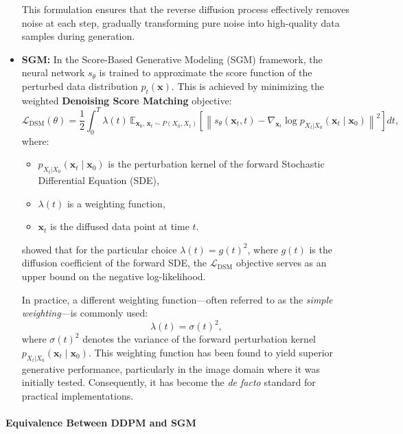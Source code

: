 \begin{itemize}
    This formulation ensures that the reverse diffusion process effectively removes noise at each step, gradually transforming pure noise into high-quality data samples during generation.


    \item \textbf{SGM:} In the Score-Based Generative Modeling (SGM) framework, the neural network \( s_{\theta} \) is trained to approximate the score function of the perturbed data distribution \( p_t(\mathbf{x}) \). This is achieved by minimizing the weighted \textbf{Denoising Score Matching} objective:
        \[
        \mathcal{L}_{\text{DSM}}(\theta) = \frac{1}{2} \int_0^T \lambda(t) \, \mathbb{E}_{\mathbf{x}_0,\, \mathbf{x}_t \sim P(X_0,X_t)} \left[ \left\| s_\theta(\mathbf{x}_t, t) - \nabla_{\mathbf{x}_t} \log p_{X_t|X_0}(\mathbf{x}_t \mid \mathbf{x}_0) \right\|^2 \right] dt,
        \]
        where:
        \begin{itemize}
            \item \( p_{X_t|X_0}(\mathbf{x}_t \mid \mathbf{x}_0) \) is the perturbation kernel of the forward Stochastic Differential Equation (SDE),
            \item \( \lambda(t) \) is a weighting function,
            \item \( \mathbf{x}_t \) is the diffused data point at time \( t \).
        \end{itemize}

        \citet{song2021maximum} showed that for the particular choice \( \lambda(t) = g(t)^2 \), where \( g(t) \) is the diffusion coefficient of the forward SDE, the \( \mathcal{L}_{\text{DSM}} \) objective serves as an upper bound on the negative log-likelihood.

        In practice, a different weighting function—often referred to as the \emph{simple weighting}—is commonly used:
        \[
        \lambda(t) = \sigma(t)^2,
        \]
        where \( \sigma(t)^2 \) denotes the variance of the forward perturbation kernel \( p_{X_t|X_0}(\mathbf{x}_t \mid \mathbf{x}_0) \). This weighting function has been found to yield superior generative performance, particularly in the image domain where it was initially tested. Consequently, it has become the \emph{de facto} standard for practical implementations.

\end{itemize}

\paragraph{Equivalence Between DDPM and SGM}

